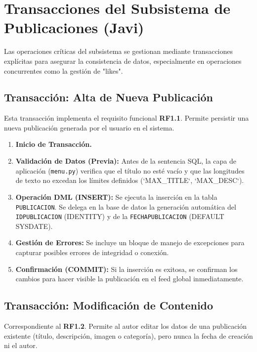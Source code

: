 \section{Transacciones del Subsistema de Publicaciones (Javi)}
Las operaciones críticas del subsistema se gestionan mediante transacciones explícitas para asegurar la consistencia de datos, especialmente en operaciones concurrentes como la gestión de "likes".

\subsection{Transacción: Alta de Nueva Publicación}
Esta transacción implementa el requisito funcional \textbf{RF1.1}. Permite persistir una nueva publicación generada por el usuario en el sistema.

\begin{enumerate}
    \item \textbf{Inicio de Transacción.}
    \item \textbf{Validación de Datos (Previa):} Antes de la sentencia SQL, la capa de aplicación (\texttt{menu.py}) verifica que el título no esté vacío y que las longitudes de texto no excedan los límites definidos (`MAX\_TITLE`, `MAX\_DESC`).
    \item \textbf{Operación DML (INSERT):} Se ejecuta la inserción en la tabla \texttt{PUBLICACION}. Se delega en la base de datos la generación automática del \texttt{IDPUBLICACION} (IDENTITY) y de la \texttt{FECHAPUBLICACION} (DEFAULT SYSDATE).
    \item \textbf{Gestión de Errores:} Se incluye un bloque de manejo de excepciones para capturar posibles errores de integridad o conexión.
    \item \textbf{Confirmación (COMMIT):} Si la inserción es exitosa, se confirman los cambios para hacer visible la publicación en el feed global inmediatamente.
\end{enumerate}

\subsection{Transacción: Modificación de Contenido}
Correspondiente al \textbf{RF1.2}. Permite al autor editar los datos de una publicación existente (título, descripción, imagen o categoría), pero nunca la fecha de creación ni el autor.

